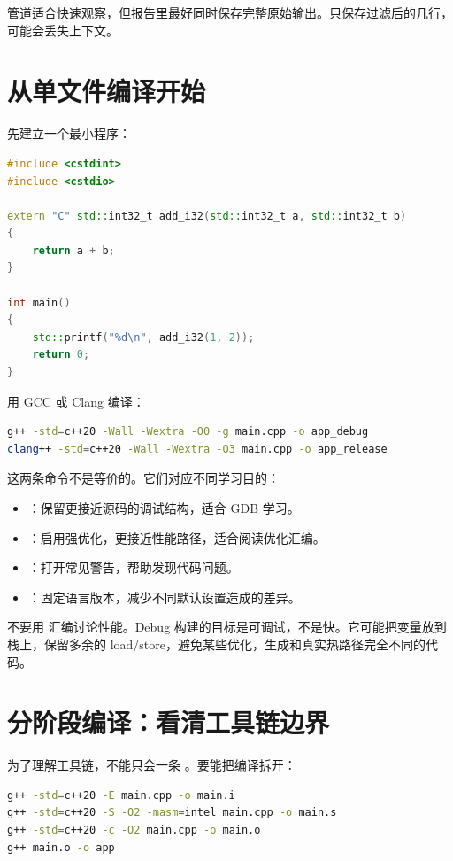 管道适合快速观察，但报告里最好同时保存完整原始输出。只保存过滤后的几行，可能会丢失上下文。

\section{从单文件编译开始}

先建立一个最小程序：

\begin{lstlisting}[language=C++]
#include <cstdint>
#include <cstdio>

extern "C" std::int32_t add_i32(std::int32_t a, std::int32_t b)
{
    return a + b;
}

int main()
{
    std::printf("%d\n", add_i32(1, 2));
    return 0;
}
\end{lstlisting}

用 GCC 或 Clang 编译：

\begin{lstlisting}[language=bash]
g++ -std=c++20 -Wall -Wextra -O0 -g main.cpp -o app_debug
clang++ -std=c++20 -Wall -Wextra -O3 main.cpp -o app_release
\end{lstlisting}

这两条命令不是等价的。它们对应不同学习目的：

\begin{itemize}
  \item {}：保留更接近源码的调试结构，适合 GDB 学习。
  \item {}：启用强优化，更接近性能路径，适合阅读优化汇编。
  \item {}：打开常见警告，帮助发现代码问题。
  \item {}：固定语言版本，减少不同默认设置造成的差异。
\end{itemize}

\begin{warningbox}
不要用  汇编讨论性能。Debug 构建的目标是可调试，不是快。它可能把变量放到栈上，保留多余的 load/store，避免某些优化，生成和真实热路径完全不同的代码。
\end{warningbox}

\section{分阶段编译：看清工具链边界}

为了理解工具链，不能只会一条 。要能把编译拆开：

\begin{lstlisting}[language=bash]
g++ -std=c++20 -E main.cpp -o main.i
g++ -std=c++20 -S -O2 -masm=intel main.cpp -o main.s
g++ -std=c++20 -c -O2 main.cpp -o main.o
g++ main.o -o app
\end{lstlisting}

